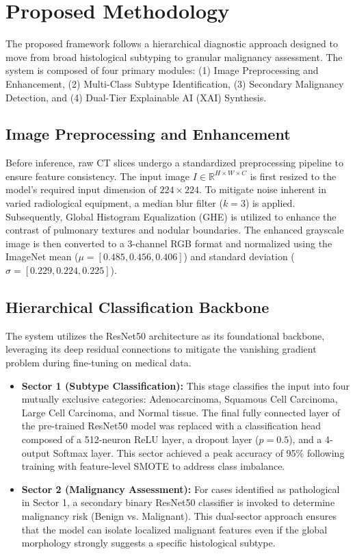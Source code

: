 \documentclass[conference]{IEEEtran}
\begin{document}
\section{Proposed Methodology}
The proposed framework follows a hierarchical diagnostic approach designed to move from broad histological subtyping to granular malignancy assessment. The system is composed of four primary modules: (1) Image Preprocessing and Enhancement, (2) Multi-Class Subtype Identification, (3) Secondary Malignancy Detection, and (4) Dual-Tier Explainable AI (XAI) Synthesis.
\subsection{Image Preprocessing and Enhancement}
Before inference, raw CT slices undergo a standardized preprocessing pipeline to ensure feature consistency. The input image $I \in \mathbb{R}^{H \times W \times C}$ is first resized to the model's required input dimension of $224 \times 224$. To mitigate noise inherent in varied radiological equipment, a median blur filter ($k=3$) is applied. Subsequently, Global Histogram Equalization (GHE) is utilized to enhance the contrast of pulmonary textures and nodular boundaries. The enhanced grayscale image is then converted to a 3-channel RGB format and normalized using the ImageNet mean ($\mu = [0.485, 0.456, 0.406]$) and standard deviation ($\sigma = [0.229, 0.224, 0.225]$).
\subsection{Hierarchical Classification Backbone}
The system utilizes the ResNet50 architecture as its foundational backbone, leveraging its deep residual connections to mitigate the vanishing gradient problem during fine-tuning on medical data.
\begin{itemize}
    \item \textbf{Sector 1 (Subtype Classification):} This stage classifies the input into four mutually exclusive categories: Adenocarcinoma, Squamous Cell Carcinoma, Large Cell Carcinoma, and Normal tissue. The final fully connected layer of the pre-trained ResNet50 model was replaced with a classification head composed of a 512-neuron ReLU layer, a dropout layer ($p=0.5$), and a 4-output Softmax layer. This sector achieved a peak accuracy of 95\% following training with feature-level SMOTE to address class imbalance.
    
    \item \textbf{Sector 2 (Malignancy Assessment):} For cases identified as pathological in Sector 1, a secondary binary ResNet50 classifier is invoked to determine malignancy risk (Benign vs. Malignant). This dual-sector approach ensures that the model can isolate localized malignant features even if the global morphology strongly suggests a specific histological subtype.
\end{itemize}
\end{document}
